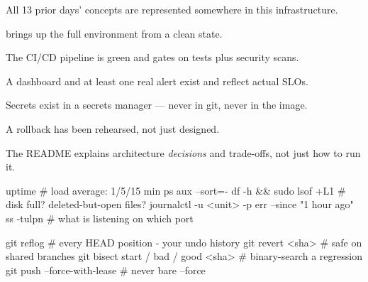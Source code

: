 \begin{buildalong}
\begin{checklist}
  \item All 13 prior days' concepts are represented somewhere in this infrastructure.
  \item {} brings up the full environment from a clean state.
  \item The CI/CD pipeline is green and gates on tests plus security scans.
  \item A dashboard and at least one real alert exist and reflect actual SLOs.
  \item Secrets exist in a secrets manager --- never in git, never in the image.
  \item A rollback has been rehearsed, not just designed.
  \item The README explains architecture \emph{decisions} and trade-offs, not just how to run it.
\end{checklist}
\end{buildalong}


\begin{bashbox}
uptime                                  # load average: 1/5/15 min
ps aux --sort=-%
df -h && sudo lsof +L1                  # disk full? deleted-but-open files?
journalctl -u <unit> -p err --since "1 hour ago"
ss -tulpn                               # what is listening on which port
\end{bashbox}

\begin{bashbox}
git reflog                              # every HEAD position - your undo history
git revert <sha>                        # safe on shared branches
git bisect start / bad / good <sha>     # binary-search a regression
git push --force-with-lease             # never bare --force
\end{bashbox}


